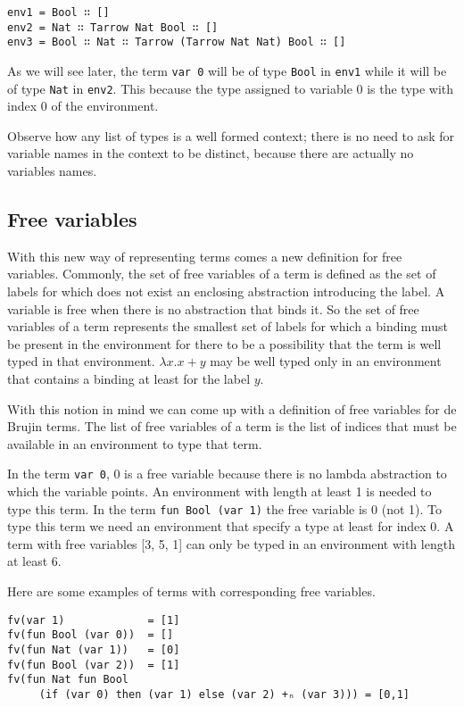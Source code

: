 \documentclass{article}
\begin{document}
\begin{verbatim}
env1 = Bool ∷ []
env2 = Nat ∷ Tarrow Nat Bool ∷ []
env3 = Bool ∷ Nat ∷ Tarrow (Tarrow Nat Nat) Bool ∷ []
\end{verbatim}

As we will see later, the term \texttt{var 0} will be of type \texttt{Bool} in \texttt{env1} while it will be of type \texttt{Nat} in \texttt{env2}.
This because the type assigned to variable 0 is the type with index 0 of the environment.

Observe how any list of types is a well formed context; there is no need to ask for variable names in the context to be distinct, because there are actually no variables names.


\subsection*{Free variables}

With this new way of representing terms comes a new definition for free variables.
Commonly, the set of free variables of a term is defined as the set of labels for which does not exist an enclosing abstraction introducing the label.
A variable is free when there is no abstraction that binds it.
So the set of free variables of a term represents the smallest set of labels for which a binding must be present in the environment for there to be a possibility that the term is well typed in that environment.
$\lambda x. x + y$ may be well typed only in an environment that contains a binding at least for the label $y$.

With this notion in mind we can come up with a definition of free variables for de Brujin terms.
The list of free variables of a term is the list of indices that must be available in an environment to type that term.

In the term \texttt{var 0}, 0 is a free variable because there is no lambda abstraction to which the variable points.
An environment with length at least 1 is needed to type this term.
In the term \texttt{fun Bool (var 1)} the free variable is 0 (not 1).
To type this term we need an environment that specify a type at least for index 0.
A term with free variables [3, 5, 1] can only be typed in an environment with length at least 6.

Here are some examples of terms with corresponding free variables.

\begin{verbatim}
fv(var 1)             = [1]
fv(fun Bool (var 0))  = []
fv(fun Nat (var 1))   = [0]
fv(fun Bool (var 2))  = [1]
fv(fun Nat fun Bool
     (if (var 0) then (var 1) else (var 2) +ₙ (var 3))) = [0,1]
\end{verbatim}
\end{document}
